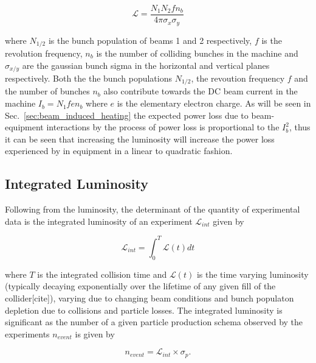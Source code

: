 \begin{equation}
\mathcal{L} = \frac{N_{1} N_{2} f n_{b}}{4 \pi \sigma_{x} \sigma_{y}}
\end{equation}

where $N_{1/2}$ is the bunch population of beams 1 and 2 respectively, $f$ is the revolution frequency, $n_{b}$ is the number of colliding bunches in the machine and $\sigma_{x/y}$ are the gaussian bunch sigma in the horizontal and vertical planes respectively. Both the the bunch populations $N_{1/2}$, the revoution frequency $f$ and the number of bunches $n_{b}$ also contribute towards the DC beam current in the machine $I_{b} = N_{1} f e n_{b}$ where $e$ is the elementary electron charge. As will be seen in Sec.~\ref{sec:beam_induced_heating} the expected power loss due to beam-equipment interactions by the process of power loss is proportional to the $I_{b}^{2}$, thus it can be seen that increasing the luminosity will increase the power loss experienced by in equipment in a linear to quadratic fashion.

\subsection{Integrated Luminosity}

Following from the luminosity, the determinant of the quantity of experimental data is the integrated luminosity of an experiment $\mathcal{L}_{int}$ given by

\begin{equation}
\mathcal{L}_{int} = \int^{T}_{0} \mathcal{L} \left( t \right) dt
\end{equation}

where $T$ is the integrated collision time and $\mathcal{L} (t)$ is the time varying luminosity (typically decaying exponentially over the lifetime of any given fill of the collider[cite]), varying due to changing beam conditions and bunch populaton depletion due to collisions and particle losses. The integrated luminosity is significant as the number of a given particle production schema observed by the experiments $n_{event}$ is given by

\begin{equation}
n_{event} = \mathcal{L}_{int} \times \sigma_{p}.
\end{equation}

